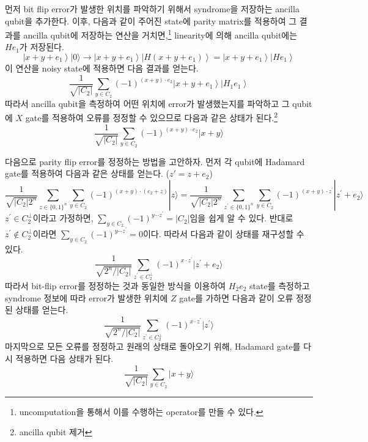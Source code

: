 먼저 bit flip error가 발생한 위치를 파악하기 위해서 syndrome을 저장하는 ancilla qubit을 추가한다. 이후, 다음과 같이 주어진 state에 parity matrix를 적용하여 그 결과를 ancilla qubit에 저장하는 연산을 거치면,\footnote{uncomputation을 통해서 이를 수행하는 operator를 만들 수 있다.} linearity에 의해 ancilla qubit에는 $H e_1$가 저장된다.
\begin{equation*}
    \left|x+y+e_1\right\rangle|0\rangle \rightarrow\left|x+y+e_1\right\rangle\left|H(x+y+e_1)\right\rangle=\left|x+y+e_1\right\rangle\left|H e_1\right\rangle
\end{equation*}
이 연산을 noisy state에 적용하면 다음 결과를 얻는다. 
\begin{equation*}
    \frac{1}{\sqrt{\left|C_2\right|}} \sum_{y \in C_2}(-1)^{(x+y)\cdot e_2}\left|x+y+e_1\right\rangle\left|H_1 e_1\right\rangle
\end{equation*}
따라서 ancilla qubit을 측정하여 어떤 위치에 error가 발생했는지를 파악하고 그 qubit에 $X$ gate를 적용하여 오류를 정정할 수 있으므로 다음과 같은 상태가 된다.\footnote{ancilla qubit 제거}
\begin{equation*}
    \frac{1}{\sqrt{\left|C_2\right|}} \sum_{y \in C_2}(-1)^{(x+y) \cdot e_2}|x+y\rangle
\end{equation*}

다음으로 parity flip error를 정정하는 방법을 고안하자. 먼저 각 qubit에 Hadamard gate를 적용하여 다음과 같은 상태를 얻는다. ($z' = z + e_2$)
\begin{equation*}
    \frac{1}{\sqrt{| C_2|2^n}} \sum_{z \in\{0,1\}^{n}} \sum_{y \in C_2}(-1)^{(x+y) \cdot(e_2+z)}  | z \rangle =\frac{1}{\sqrt{|C_2| 2^n}} \sum_{z^{\prime} \in\{0,1\}^n} \sum_{y \in C_2}(-1)^{(x+y) \cdot z^{\prime}} |z^{\prime}+e_2\rangle
\end{equation*}
$z^{\prime} \in C_2^{\perp}$이라고 가정하면, $\sum_{y \in C_2}(-1)^{y \cdots z^{\prime}}=\left|C_2\right|$임을 쉽게 알 수 있다. 반대로 $z^{\prime} \notin C_2^{\perp}$이라면 $\sum_{y \in C_2}(-1)^{y \cdots z^{\prime}}=0$이다. 따라서 다음과 같이 상태를 재구성할 수 있다.
\begin{equation*}
    \frac{1}{\sqrt{2^n /\left|C_2\right|}} \sum_{z^{\prime} \in C_{2}^{\perp}}(-1)^{x \cdot z^{\prime}} | z^{\prime}+e_2 \rangle
\end{equation*}
따라서 bit-flip error를 정정하는 것과 동일한 방식을 이용하여 $H_2e_2$ state를 측정하고 syndrome 정보에 따라 error가 발생한 위치에 $Z$ gate를 가하면 다음과 같이 오류 정정된 상태를 얻는다.
\begin{equation*}
    \frac{1}{\sqrt{2^n /\left|C_2\right|}} \sum_{z^{\prime} \in C_{2}^{\perp}}(-1)^{x \cdot z^{\prime}} | z^{\prime} \rangle
\end{equation*}
마지막으로 모든 오류를 정정하고 원래의 상태로 돌아오기 위해, Hadamard gate를 다시 적용하면 다음 상태가 된다.
\begin{equation*}
    \frac{1}{\sqrt{\left|C_2\right|}} \sum_{y \in C_2}|x+y\rangle
\end{equation*}

